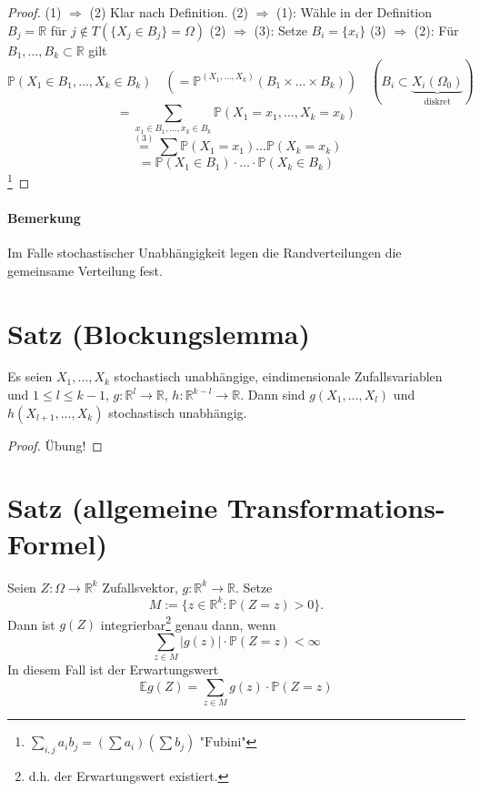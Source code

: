 \documentclass[a4paper,11pt,notitlepage]{report}
\newcommand{\R}{{\ensuremath{\mathbb{R}}}}
\newcommand{\Prim}{{\ensuremath{\mathbb{P}}}}
\begin{document}
\begin{proof}
	(1) $\Rightarrow$ (2) Klar nach Definition.
	\newline
	(2) $\Rightarrow$ (1): Wähle in der Definition $B_j = \R$ für $j \notin T (\{X_j \in B_j\} = \Omega)$
	\newline
	(2) $\Rightarrow$ (3): Setze $B_i = \{x_i\}$
	\newline
	(3) $\Rightarrow$ (2): Für $B_1, \ldots, B_k \subset \R$ gilt
		$$\Prim(X_1 \in B_1, \ldots, X_k \in B_k) \quad (=\Prim^{(X_1,\ldots,X_k)}(B_1 \times \ldots \times B_k)) \quad (B_i \subset \underbrace{X_i(\Omega_0)}_{\text{diskret}})$$
		$$= \sum\limits_{x_1 \in B_1, \ldots, x_k \in B_k}{\Prim(X_1 = x_1, \ldots, X_k = x_k)}$$
		$$\overset{(3)}{=} \sum{\Prim(X_1 = x_1) \ldots \Prim(X_k = x_k)}$$
		$$= \Prim(X_1 \in B_1) \cdot \ldots \cdot \Prim(X_k \in B_k)$$\footnote{$\sum\limits_{i,j}{a_ib_j} = (\sum{a_i})(\sum{b_j}) \text{ "Fubini"}$}
\end{proof}

\paragraph{Bemerkung}
Im Falle stochastischer Unabhängigkeit legen die Randverteilungen die gemeinsame Verteilung fest.

\section{Satz (Blockungslemma)}
Es seien $X_1, \ldots, X_k$ stochastisch unabhängige, eindimensionale Zufallsvariablen und $1 \leq l \leq k-1$, $g \colon \R^l \rightarrow \R$, $h \colon \R^{k-l} \rightarrow \R$. Dann sind 
$g(X_1, \ldots, X_l)$ und $h(X_{l+1}, \ldots, X_k)$ stochastisch unabhängig.

\begin{proof}
Übung!
\end{proof}

\section{Satz (allgemeine Transformations-Formel)}
Seien $Z \colon \Omega \rightarrow \R^k$ Zufallsvektor, $g \colon \R^k \rightarrow \R$. Setze
$$M := \{ z \in \R^k \colon \Prim(Z=z)>0\}.$$
Dann ist $g(Z)$ integrierbar\footnote{d.h. der Erwartungswert existiert.} genau dann, wenn
$$\sum\limits_{z \in M}{|g(z)| \cdot \Prim(Z=z)} < \infty$$
In diesem Fall ist der Erwartungswert
$$\mathbb{E} g(Z) = \sum\limits_{z \in M}{g(z) \cdot \Prim(Z=z)}$$
\end{document}
